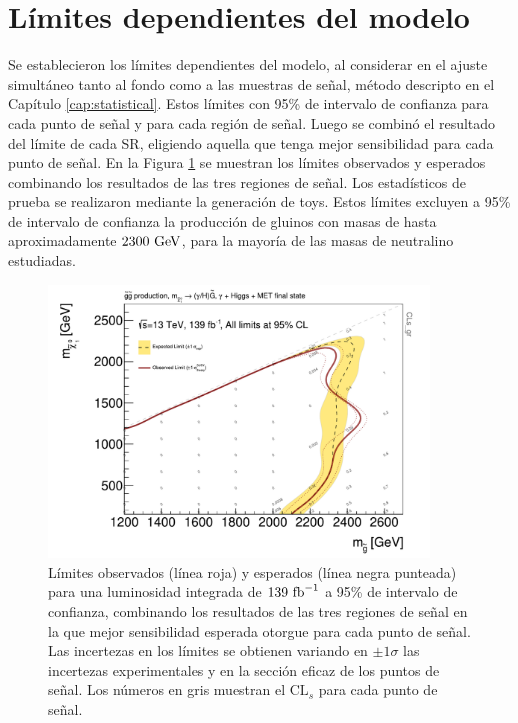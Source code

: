 \section{Límites dependientes del modelo}


Se establecieron los límites dependientes del modelo, al considerar en el ajuste simultáneo tanto al fondo como a las muestras de señal, método descripto en el Capítulo \ref{cap:statistical}. Estos límites con 95\% de intervalo de confianza para cada punto de señal y para cada región de señal. Luego se combinó el resultado del límite de cada SR, eligiendo aquella que tenga mejor sensibilidad para cada punto de señal. En la Figura \ref{fig:limit_plot_combined} se muestran los límites observados y esperados combinando los resultados de las tres regiones de señal. Los estadísticos de prueba se realizaron mediante la generación de  toys. Estos límites excluyen a 95\% de intervalo de confianza la producción de gluinos con masas de hasta aproximadamente $2300\ \text{GeV}$, para la mayoría de las masas de neutralino estudiadas.


\begin{figure}[ht!]
  \centering


  \includegraphics[width=0.9\textwidth]{images/results/limits_plots/contour_plot_gHBestSR_wMatplotLib_full.pdf}

  \caption{Límites observados (línea roja) y esperados (línea negra punteada) para una luminosidad integrada de $139\ \text{fb}^{-1}$ a 95\% de intervalo de confianza, combinando los resultados de las tres regiones de señal en la que mejor sensibilidad esperada otorgue para cada punto de señal. Las incertezas en los límites se obtienen variando en $\pm1\sigma$ las incertezas experimentales y en la sección eficaz de los puntos de señal. Los números en gris muestran el $\text{CL}_{s}$ para cada punto de señal.}
  \label{fig:limit_plot_combined}

\end{figure}
